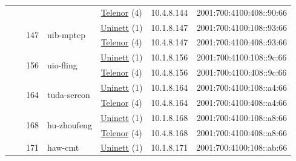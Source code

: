 \begin{small}
\begin{center}
\begin{longtable}{|c|c|c|c|c|c|c|c|}
  &  &  &  & \multicolumn{2}{|c|}{\tiny{\href{https://www.telenor.no}{Telenor} (4)}} & \tiny{10.4.8.144} & \tiny{2001:700:4100:408::90:66} \\* \cline{3-3}\cline{4-4}\cline{5-5}\cline{6-6}\cline{7-7}\cline{8-8}
  &  & \multirow{2}{*}{\tiny{147}} & \multicolumn{1}{|l|}{\multirow{2}{*}{\tiny{uib-mptcp}}} & \multicolumn{2}{|c|}{\tiny{\href{https://www.uninett.no}{Uninett} (1)}} & \tiny{10.1.8.147} & \tiny{2001:700:4100:108::93:66} \\* \cline{5-5}\cline{6-6}\cline{7-7}\cline{8-8}
  &  &  &  & \multicolumn{2}{|c|}{\tiny{\href{https://www.telenor.no}{Telenor} (4)}} & \tiny{10.4.8.147} & \tiny{2001:700:4100:408::93:66} \\* \cline{3-3}\cline{4-4}\cline{5-5}\cline{6-6}\cline{7-7}\cline{8-8}
  &  & \multirow{2}{*}{\tiny{156}} & \multicolumn{1}{|l|}{\multirow{2}{*}{\tiny{uio-fling}}} & \multicolumn{2}{|c|}{\tiny{\href{https://www.uninett.no}{Uninett} (1)}} & \tiny{10.1.8.156} & \tiny{2001:700:4100:108::9c:66} \\* \cline{5-5}\cline{6-6}\cline{7-7}\cline{8-8}
  &  &  &  & \multicolumn{2}{|c|}{\tiny{\href{https://www.telenor.no}{Telenor} (4)}} & \tiny{10.4.8.156} & \tiny{2001:700:4100:408::9c:66} \\* \cline{3-3}\cline{4-4}\cline{5-5}\cline{6-6}\cline{7-7}\cline{8-8}
  &  & \multirow{2}{*}{\tiny{164}} & \multicolumn{1}{|l|}{\multirow{2}{*}{\tiny{tuda-sereon}}} & \multicolumn{2}{|c|}{\tiny{\href{https://www.uninett.no}{Uninett} (1)}} & \tiny{10.1.8.164} & \tiny{2001:700:4100:108::a4:66} \\* \cline{5-5}\cline{6-6}\cline{7-7}\cline{8-8}
  &  &  &  & \multicolumn{2}{|c|}{\tiny{\href{https://www.telenor.no}{Telenor} (4)}} & \tiny{10.4.8.164} & \tiny{2001:700:4100:408::a4:66} \\* \cline{3-3}\cline{4-4}\cline{5-5}\cline{6-6}\cline{7-7}\cline{8-8}
  &  & \multirow{2}{*}{\tiny{168}} & \multicolumn{1}{|l|}{\multirow{2}{*}{\tiny{hu-zhoufeng}}} & \multicolumn{2}{|c|}{\tiny{\href{https://www.uninett.no}{Uninett} (1)}} & \tiny{10.1.8.168} & \tiny{2001:700:4100:108::a8:66} \\* \cline{5-5}\cline{6-6}\cline{7-7}\cline{8-8}
  &  &  &  & \multicolumn{2}{|c|}{\tiny{\href{https://www.telenor.no}{Telenor} (4)}} & \tiny{10.4.8.168} & \tiny{2001:700:4100:408::a8:66} \\* \cline{3-3}\cline{4-4}\cline{5-5}\cline{6-6}\cline{7-7}\cline{8-8}
  &  & \multirow{2}{*}{\tiny{171}} & \multicolumn{1}{|l|}{\multirow{2}{*}{\tiny{haw-cmt}}} & \multicolumn{2}{|c|}{\tiny{\href{https://www.uninett.no}{Uninett} (1)}} & \tiny{10.1.8.171} & \tiny{2001:700:4100:108::ab:66} \\* \cline{5-5}\cline{6-6}\cline{7-7}\cline{8-8}

\end{longtable}
\end{center}
\end{small}
